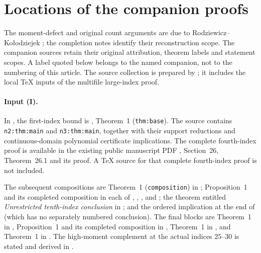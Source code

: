 \section{Locations of the companion proofs}\label{app:companions}

The moment-defect and original count arguments are due to
Rodziewicz--Ko\l{}odziejek \cite{RK2026}; the completion notes identify
their reconstruction scope. The companion sources retain their original
attribution, theorem labels and statement scopes. A label quoted below belongs to the named companion,
not to the numbering of this article. The source collection is prepared
by ; it includes the local TeX
inputs of the multifile large-index proof.

\paragraph{Input (I).}
In , the first-index bound is
, Theorem~1 (\texttt{thm:base}).
The source  contains
\texttt{n2:thm:main} and \texttt{n3:thm:main}, together with their
support reductions and continuous-domain polynomial certificate
implications. The complete fourth-index proof is available in the
existing public manuscript PDF
,
Section~26, Theorem~26.1 and its proof. A TeX source for that complete
fourth-index proof is not included.

The subsequent compositions are Theorem~1
(\texttt{composition}) in ;
Proposition~1 and its completed composition in each of
,
,
, and
;
the theorem entitled \emph{Unrestricted tenth-index conclusion}
in ; and the ordered implication at the end of
(which has no separately numbered conclusion).
The final blocks are Theorem~1 in ,
Proposition~1 and its completed composition in
,
Theorem~1 in , and
Theorem~1 in .
The high-moment complement at the actual indices $25$--$30$
is stated and derived in .

